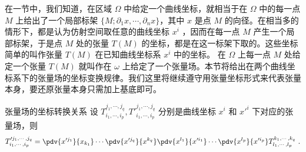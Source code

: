 
在一节中，我们知道，在区域 $\Omega$ 中给定一个曲线坐标，就相当于在 $\Omega$ 中的每一点 $M$ 上给出了一个局部标架 $\{M;\partial_1 x,\cdots,\partial_n x\}$，其中 $x$ 是点 $M$ 的向径。在相当多的情形下，都是认为仿射空间取任意的曲线坐标 $x^i$ ，因而在每一点 $M$ 产生一个局部标架，于是点 $M$ 处的张量 $T(M)$ 的坐标，都是在这一标架下取的。这些坐标简单的叫作张量 $T(M)$ 在已知曲线坐标系 $x^i$ 中的坐标。 在 $\Omega$ 上每一点 $M$ 处给定一个张量 $T(M)$ 就叫作在 $\omega$ 上给定了一个张量场。本节将给出在两个曲线坐标系下的张量场的坐标变换规律。我们这里将继续遵守用张量坐标形式来代表张量本身，要还原张量本身只需加上基底即可。

\begin{theorem}{张量场的坐标转换关系}
设 $T^{j_1,\cdots,j_q}_{i_1,\cdots,i_p},T'^{j_1,\cdots,j_q}_{i_1,\cdots,i_p}$ 分别是曲线坐标 $x^i$ 和 $x'^i$ 下对应的张量场，则
\begin{equation}
T'^{j_1,\cdots,j_q}_{i_1,\cdots,i_p}=\pdv{x'^{j_1}}{x_{k_1}}\cdots \pdv{x'^{j_q}}{x^{k_q}}\pdv{x^{l_1}}{x'^{i_1}}\cdots \pdv{x^{l_p}}{x'^{i_p}}T^{k_1,\cdots,k_q}_{l_1,\cdots,l_p}~.
\end{equation}
 
\end{theorem}
